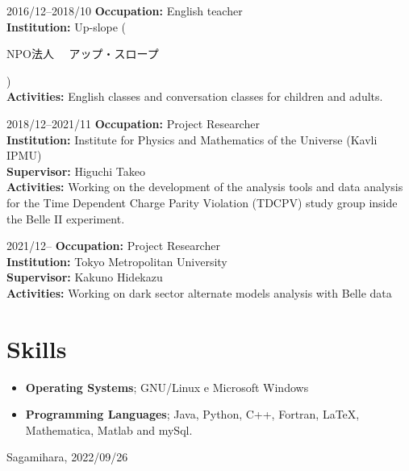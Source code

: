 \documentclass[a4paper]{article}
\begin{document}
\begin{CV}
\item[2016/12--2018/10] \textbf{Occupation:} English teacher
\\ \textbf{Institution:} Up-slope (\begin{CJK}{UTF8}{ipxm} NPO法人　 アップ・スロープ  \end{CJK})
\\ \textbf{Activities:} English classes and conversation classes for children and
adults.

\item[2018/12--2021/11] \textbf{Occupation:} Project Researcher
\\ \textbf{Institution:} Institute for Physics and Mathematics of the Universe
(Kavli IPMU)
\\ \textbf{Supervisor:} Higuchi Takeo
\\ \textbf{Activities:} Working on the development of the analysis tools and
data analysis for the Time Dependent Charge Parity Violation (TDCPV) study group inside the Belle II experiment.

\item[2021/12--] \textbf{Occupation:} Project Researcher
  \\ \textbf{Institution:} Tokyo Metropolitan University
  \\ \textbf{Supervisor:} Kakuno Hidekazu
  \\ \textbf{Activities:} Working on dark sector alternate models analysis with
  Belle data
\end{CV}
 
\section{Skills}

\begin{itemize}
	\item \textbf{Operating Systems}; GNU/Linux e Microsoft Windows
	\item \textbf{Programming Languages}; Java, Python, C++, Fortran, \LaTeX, Mathematica, Matlab and mySql.
\end{itemize}
\vspace{2\baselineskip}
\noindent Sagamihara, 2022/09/26

 
\end{document}
